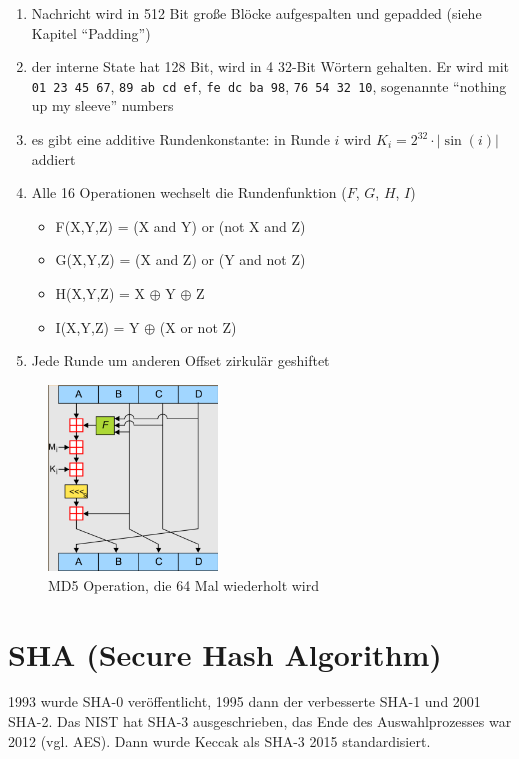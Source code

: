 \begin{enumerate}
    \item Nachricht wird in 512 Bit große Blöcke aufgespalten und gepadded (siehe Kapitel ``Padding'')
    \item der interne State hat 128 Bit, wird in 4 32-Bit Wörtern gehalten. Er wird mit \verb|01 23 45 67|, \verb|89 ab cd ef|, \verb|fe dc ba 98|, \verb|76 54 32 10|, 
    sogenannte ``nothing up my sleeve'' numbers
    \item es gibt eine additive Rundenkonstante: in Runde $i$ wird $K_i = 2^{32}\cdot|\sin(i)|$ addiert 
    \item Alle 16 Operationen wechselt die Rundenfunktion ($F$, $G$, $H$, $I$)
    \begin{itemize}
        \item F(X,Y,Z) = (X and Y) or (not X and Z)
        \item G(X,Y,Z) = (X and Z) or (Y and not Z)
        \item H(X,Y,Z) = X $\oplus$ Y $\oplus$ Z
        \item I(X,Y,Z) = Y $\oplus$ (X or not Z)
    \end{itemize}
    \item Jede Runde um anderen Offset zirkulär geshiftet
\end{enumerate}

\begin{figure}[h]
    \includegraphics[width=0.4\textwidth]{figures/fig09-md5}
    \centering
    \caption{MD5 Operation, die 64 Mal wiederholt wird}
\end{figure}


\section{SHA (Secure Hash Algorithm)}

1993 wurde SHA-0 veröffentlicht, 1995 dann der verbesserte SHA-1 und 2001 SHA-2. Das NIST hat SHA-3 ausgeschrieben, das Ende des Auswahlprozesses war 2012 (vgl. AES).
Dann wurde Keccak als SHA-3 2015 standardisiert. \\


